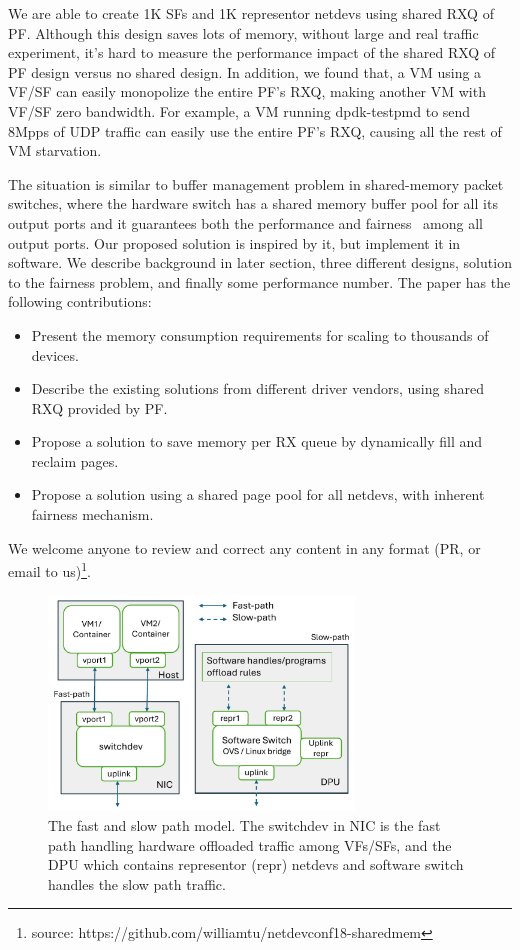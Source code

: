 \documentclass[letterpaper]{article}
\begin{document}
We are able to create 1K SFs and 1K representor netdevs using shared RXQ
of PF. Although this design saves lots of memory, without large and real traffic experiment, it's hard to measure the performance impact of the shared RXQ
of PF design versus no shared design.
In addition, we found that, a VM using a VF/SF can easily monopolize the
entire PF's RXQ, making another VM with VF/SF zero bandwidth.
For example, a VM
running dpdk-testpmd to send 8Mpps of UDP traffic can easily use the
entire PF's RXQ, causing all the rest of VM starvation.

The situation is similar to buffer management problem in shared-memory
packet switches, where the hardware switch has a shared memory buffer pool
for all its output ports and it guarantees both the performance and
fairness~\cite{devlinksb, queuelength} among all output ports.
Our proposed solution is inspired by it, but implement it in software.
We describe background in later section, three different designs,
solution to the fairness problem, and finally some performance
number. The paper has the following contributions:
\begin{itemize}
    \item Present the memory consumption requirements for scaling to
          thousands of devices.
    \item Describe the existing solutions from different driver vendors,
          using shared RXQ provided by PF.
    \item Propose a solution to save memory per RX queue by dynamically
          fill and reclaim pages.
    \item Propose a solution using a shared page pool for all netdevs,
          with inherent fairness mechanism.
\end{itemize}
We welcome anyone to review and correct any content in any format (PR, or email to us)\footnote{source: https://github.com/williamtu/netdevconf18-sharedmem}.

\begin{figure}[t!]
\includegraphics[width=3.2in]{arch.pdf}
\caption{The fast and slow path model. The switchdev in NIC is the fast path handling
hardware offloaded traffic among VFs/SFs, and the DPU which contains representor (repr) netdevs and software switch handles the slow path traffic.}
\label{fig:arch}
\end{figure}
\end{document}
